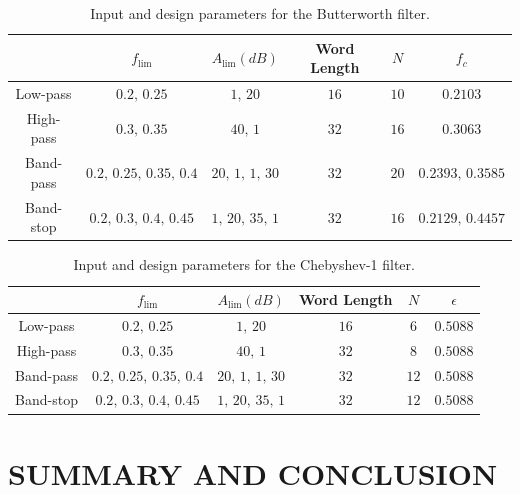 \documentclass{sebase}
\begin{document}
\begin{center}
\begin{table}[tbp] \centering%
\begin{tabular}{|c|c|c|c|c|c|}
\hline
& $f_{\lim }$ & $A_{\lim }\left( dB\right) $ & Word Length & $N$ & $f_{c}$
\\ \hline
Low-pass & $0.2,\,0.25$ & $1,\,20$ & $16$ & $10$ & $0.2103$ \\ \hline
High-pass & $0.3,\,0.35$ & $40,\,1$ & $32$ & $16$ & $0.3063$ \\ \hline
Band-pass & $0.2,\,0.25,\,0.35,\,0.4$ & $20,\,1,\,1,\,30$ & $32$ & $20$ & $%
0.2393,\,0.3585$ \\ \hline
Band-stop & $0.2,\,0.3,\,0.4,\,0.45$ & $1,\,20,\,35,\,1$ & $32$ & $16$ & $%
0.2129,\,0.4457$ \\ \hline
\end{tabular}
\caption{Input and design parameters for the Butterworth
filter.\label{ButterTable}} 
\end{table}%

\begin{table}[tbp] \centering%
\begin{tabular}{|c|c|c|c|c|c|}
\hline
& $f_{\lim }$ & $A_{\lim }\left( dB\right) $ & Word Length & $N$ & $\epsilon 
$ \\ \hline
Low-pass & $0.2,\,0.25$ & $1,\,20$ & $16$ & $6$ & $0.5088$ \\ \hline
High-pass & $0.3,\,0.35$ & $40,\,1$ & $32$ & $8$ & $0.5088$ \\ \hline
Band-pass & $0.2,\,0.25,\,0.35,\,0.4$ & $20,\,1,\,1,\,30$ & $32$ & $12$ & $%
0.5088$ \\ \hline
Band-stop & $0.2,\,0.3,\,0.4,\,0.45$ & $1,\,20,\,35,\,1$ & $32$ & $12$ & $%
0.5088$ \\ \hline
\end{tabular}
\caption{Input and design parameters for the Chebyshev-1 filter.
\label{Cheb1Table}} 
\end{table}%
\end{center}

\section{SUMMARY AND CONCLUSION}
\end{document}
